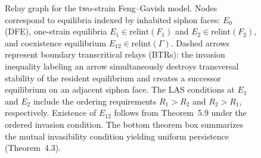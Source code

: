 \begin{figure}[H]

\caption{
Relay graph for the two-strain Feng--Gavish model.
Nodes correspond to equilibria indexed by inhabited siphon faces:
$E_0$ (DFE), one-strain equilibria
$E_1\in\mathrm{relint}(F_1)$ and
$E_2\in\mathrm{relint}(F_2)$,
and coexistence equilibrium
$E_{12}\in\mathrm{relint}(\Gamma)$.
Dashed arrows represent boundary transcritical relays (BTRs):
the invasion inequality labeling an arrow simultaneously destroys
transversal stability of the resident equilibrium and creates a successor
equilibrium on an adjacent siphon face.
The LAS conditions at $E_1$ and $E_2$ include the ordering requirements
$R_1>R_2$ and $R_2>R_1$, respectively.
Existence of $E_{12}$ follows from Theorem~5.9 under the ordered
invasion condition.
The bottom theorem box summarizes the mutual invasibility condition
yielding uniform persistence (Theorem~4.3).
}
\end{figure}
\fi
